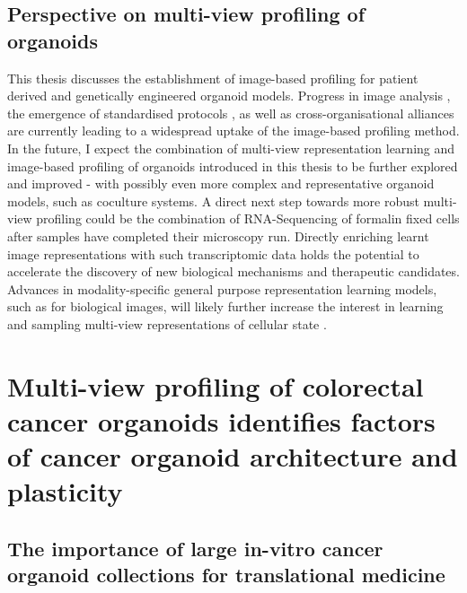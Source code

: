 \begin{flushleft}
\subsection{Perspective on multi-view profiling of organoids}
This thesis discusses the establishment of image-based profiling for patient derived and genetically engineered organoid models. Progress in image analysis \cite{chandrasekaranImagebasedProfilingDrug2021a}, the emergence of standardised protocols \cite{Bray2016-ue}, as well as cross-organisational alliances \cite{chandrasekaranJUMPCellPainting2023} are currently leading to a widespread uptake of the image-based profiling method. In the future, I expect the combination of multi-view representation learning and image-based profiling of organoids introduced in this thesis to be further explored and improved - with possibly even more complex and representative organoid models, such as coculture systems. A direct next step towards more robust multi-view profiling could be the combination of RNA-Sequencing of formalin fixed cells after samples have completed their microscopy run. Directly enriching learnt image representations with such transcriptomic data holds the potential to accelerate the discovery of new biological mechanisms and therapeutic candidates. Advances in modality-specific general purpose representation learning models, such as for biological images, will likely further increase the interest in learning and sampling multi-view representations of cellular state \cite{pfaendlerSelfsupervisedVisionTransformers2023}.



\section{Multi-view profiling of colorectal cancer organoids identifies factors of cancer organoid architecture and plasticity}

\subsection{The importance of large in-vitro cancer organoid collections for translational medicine}


\end{flushleft}
